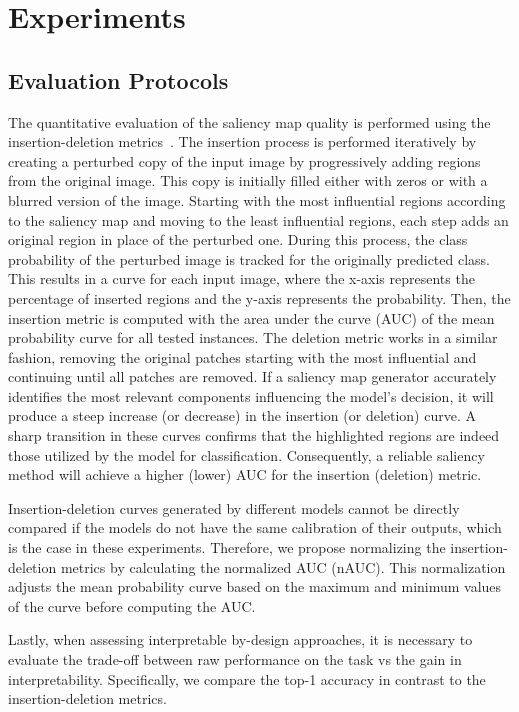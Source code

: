 \section{Experiments}




\subsection{Evaluation Protocols}

The quantitative evaluation of the saliency map quality is performed using the insertion-deletion metrics~\cite{Petsiuk2018rise}. The insertion process is performed iteratively by creating a perturbed copy of the input image by progressively adding regions from the original image. This copy is initially filled either with zeros or with a blurred version of the image. Starting with the most influential regions according to the saliency map and moving to the least influential regions, each step adds an original region in place of the perturbed one. During this process, the class probability of the perturbed image is tracked for the originally predicted class. This results in a curve for each input image, where the x-axis represents the percentage of inserted regions and the y-axis represents the probability. 
Then, the insertion metric is computed with the area under the curve (AUC) of the mean probability curve for all tested instances. 
The deletion metric works in a similar fashion, removing the original patches starting with the most influential and continuing until all patches are removed. 
If a saliency map generator accurately identifies the most relevant components influencing the model's decision, it will produce a steep increase (or decrease) in the insertion (or deletion) curve. A sharp transition in these curves confirms that the highlighted regions are indeed those utilized by the model for classification. Consequently, a reliable saliency method will achieve a higher (lower) AUC for the insertion (deletion) metric.

Insertion-deletion curves generated by different models cannot be directly compared if the models do not have the same calibration of their outputs, which is the case in these experiments. Therefore, we propose normalizing the insertion-deletion metrics by calculating the normalized AUC (nAUC). 
This normalization adjusts the mean probability curve based on the maximum and minimum values of the curve before computing the AUC.


Lastly, when assessing interpretable by-design approaches, it is necessary to evaluate the trade-off between raw performance on the task vs the gain in interpretability. Specifically, we compare the top-1 accuracy in contrast to the insertion-deletion metrics. %


